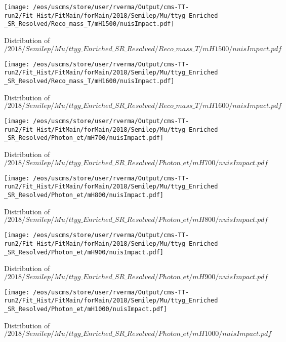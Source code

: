 \begin{figure}
\centering
\texttt{[image: /eos/uscms/store/user/rverma/Output/cms-TT-run2/Fit\_Hist/FitMain/forMain/2018/Semilep/Mu/ttyg\_Enriched\_SR\_Resolved/Reco\_mass\_T/mH1500/nuisImpact.pdf]}
\caption{Distribution of $/2018/Semilep/Mu/ttyg\_Enriched\_SR\_Resolved/Reco\_mass\_T/mH1500/nuisImpact.pdf$}
\end{figure}

\begin{figure}
\centering
\texttt{[image: /eos/uscms/store/user/rverma/Output/cms-TT-run2/Fit\_Hist/FitMain/forMain/2018/Semilep/Mu/ttyg\_Enriched\_SR\_Resolved/Reco\_mass\_T/mH1600/nuisImpact.pdf]}
\caption{Distribution of $/2018/Semilep/Mu/ttyg\_Enriched\_SR\_Resolved/Reco\_mass\_T/mH1600/nuisImpact.pdf$}
\end{figure}

\begin{figure}
\centering
\texttt{[image: /eos/uscms/store/user/rverma/Output/cms-TT-run2/Fit\_Hist/FitMain/forMain/2018/Semilep/Mu/ttyg\_Enriched\_SR\_Resolved/Photon\_et/mH700/nuisImpact.pdf]}
\caption{Distribution of $/2018/Semilep/Mu/ttyg\_Enriched\_SR\_Resolved/Photon\_et/mH700/nuisImpact.pdf$}
\end{figure}

\begin{figure}
\centering
\texttt{[image: /eos/uscms/store/user/rverma/Output/cms-TT-run2/Fit\_Hist/FitMain/forMain/2018/Semilep/Mu/ttyg\_Enriched\_SR\_Resolved/Photon\_et/mH800/nuisImpact.pdf]}
\caption{Distribution of $/2018/Semilep/Mu/ttyg\_Enriched\_SR\_Resolved/Photon\_et/mH800/nuisImpact.pdf$}
\end{figure}

\begin{figure}
\centering
\texttt{[image: /eos/uscms/store/user/rverma/Output/cms-TT-run2/Fit\_Hist/FitMain/forMain/2018/Semilep/Mu/ttyg\_Enriched\_SR\_Resolved/Photon\_et/mH900/nuisImpact.pdf]}
\caption{Distribution of $/2018/Semilep/Mu/ttyg\_Enriched\_SR\_Resolved/Photon\_et/mH900/nuisImpact.pdf$}
\end{figure}

\begin{figure}
\centering
\texttt{[image: /eos/uscms/store/user/rverma/Output/cms-TT-run2/Fit\_Hist/FitMain/forMain/2018/Semilep/Mu/ttyg\_Enriched\_SR\_Resolved/Photon\_et/mH1000/nuisImpact.pdf]}
\caption{Distribution of $/2018/Semilep/Mu/ttyg\_Enriched\_SR\_Resolved/Photon\_et/mH1000/nuisImpact.pdf$}
\end{figure}

